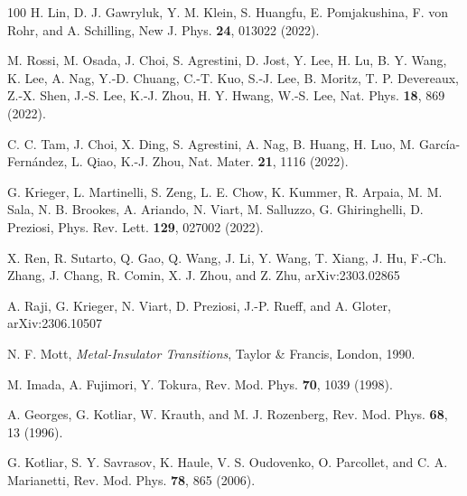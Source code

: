 \documentclass[prl,twocolumn,preprintnumbers,superscriptaddress]{revtex4-1}
\begin{document}
\begin{thebibliography}{100}
H. Lin, D. J. Gawryluk, Y. M. Klein, S. Huangfu, E. Pomjakushina, F. von Rohr, and A. Schilling, New J. Phys. \textbf{24}, 013022 (2022).


M. Rossi, M. Osada, J. Choi, S. Agrestini, D. Jost, Y. Lee, H. Lu, B. Y. Wang, K. Lee, A. Nag, Y.-D. Chuang, C.-T. Kuo, S.-J. Lee, B. Moritz, T. P. Devereaux, Z.-X. Shen, J.-S. Lee, K.-J. Zhou, H. Y. Hwang, W.-S. Lee, Nat. Phys. \textbf{18}, 869 (2022).

C. C. Tam, J. Choi, X. Ding, S. Agrestini, A. Nag, B. Huang, H. Luo, M. Garc\' ia-Fern\' andez, L. Qiao, K.-J. Zhou, Nat. Mater. \textbf{21}, 1116 (2022).

G. Krieger, L. Martinelli, S. Zeng, L. E. Chow, K. Kummer, R. Arpaia, M. M. Sala, N. B. Brookes, A. Ariando, N. Viart, M. Salluzzo, G. Ghiringhelli, D. Preziosi, Phys. Rev. Lett. \textbf{129}, 027002 (2022).

X. Ren, R. Sutarto, Q. Gao, Q. Wang, J. Li, Y. Wang, T. Xiang, J. Hu, F.-Ch. Zhang, J. Chang, R. Comin, X. J. Zhou, and Z. Zhu, arXiv:2303.02865

A. Raji, G. Krieger, N. Viart, D. Preziosi, J.-P. Rueff, and A. Gloter, arXiv:2306.10507

 N. F. Mott, \emph{Metal-Insulator Transitions}, Taylor \& Francis, London, 1990.

M. Imada, A. Fujimori, Y. Tokura, Rev. Mod. Phys. \textbf{70}, 1039 (1998).


A. Georges, G. Kotliar, W. Krauth, and M. J. Rozenberg, Rev. Mod. Phys. \textbf{68}, 13 (1996).

G. Kotliar, S. Y. Savrasov, K. Haule, V. S. Oudovenko, O. Parcollet, and C. A. Marianetti, Rev. Mod. Phys. \textbf{78},
865 (2006).



\end{thebibliography}
\end{document}
